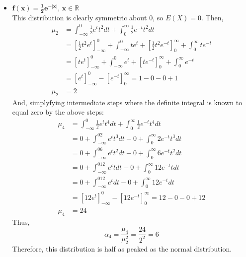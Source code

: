 \documentclass{article}
\newcommand{\R}{\mathbb{R}}
\begin{document}
\begin{enumerate}
\begin{itemize}
			\item $\mathbf{f(x)=\frac{1}{2}e^{-|x|}\text{, }x\in\R}$
				\bigskip \\
				This distribution is clearly symmetric about $0$, so $E(X)=0$. Then, 
				\begin{align*}
					\mu_2 	&= \int_{-\infty}^0\frac{1}{2} e^tt^2dt + \int_0^\infty\frac{1}{2} e^{-t}t^2dt 											\\ 
							&= [\frac{1}{2}t^2e^t]^0_{-\infty} + \int_{-\infty}^0te^t + [\frac{1}{2}t^2e^{-t}]_0^\infty + \int_0^\infty te^{-t}		\\
							&= [te^t]^0_{-\infty} + \int_{-\infty}^0e^t + [te^{-t}]_0^\infty + \int_0^\infty e^{-t}									\\
							&= [e^t]^0_{-\infty} - [e^{-t}]_0^\infty = 1 - 0 - 0 + 1																\\
					\mu_2	&= 2
				\end{align*}
				And, simplyfying intermediate steps where the definite integral is known to equal zero by the above steps:
				\begin{align*}
					\mu_4 	&= \int_{-\infty}^0\frac{1}{2} e^tt^4dt + \int_0^\infty\frac{1}{2} e^{-t}t^4dt 	\\
							&= 0 + \int_{-\infty}^02 e^tt^3dt - 0 + \int_0^\infty2 e^{-t}t^3dt				\\
							&= 0 + \int_{-\infty}^06 e^tt^2dt - 0 + \int_0^\infty6 e^{-t}t^2dt				\\
							&= 0 + \int_{-\infty}^012 e^ttdt - 0 + \int_0^\infty12 e^{-t}tdt				\\
							&= 0 + \int_{-\infty}^012 e^tdt - 0 + \int_0^\infty12 e^{-t}dt					\\
							&= [12e^t]^0_{-\infty} - [12e^{-t}]^\infty_0 = 12 - 0 - 0 + 12					\\
					\mu_4 	&= 24
				\end{align*}
				Thus,
				\[
					\alpha_4 = \dfrac{\mu_4}{\mu_2^2} = \dfrac{24}{2^2} = 6
				\]
				Therefore, this distribution is half as peaked as the normal distribution.
				
		\end{itemize}
		
		
\end{enumerate}

\end{document}
